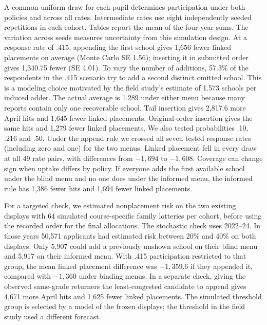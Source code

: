 A common uniform draw for each pupil determines participation under both policies and across all rates. Intermediate rates use eight independently seeded repetitions in each cohort. Tables report the mean of the four-year sums. The variation across seeds measures uncertainty from this simulation design. At a response rate of .415, appending the first school gives 1,656 fewer linked placements on average (Monte Carlo SE 1.56); inserting it in submitted order gives 1,340.75 fewer (SE 4.01). To vary the number of additions, 57.3\% of the respondents in the .415 scenario try to add a second distinct omitted school. This is a modeling choice motivated by the field study's estimate of 1.573 schools per induced adder. The actual average is 1.289 under either menu because many reports contain only one recoverable school. Tail insertion gives 2,817.6 more April hits and 1,645 fewer linked placements. Original-order insertion gives the same hits and 1,279 fewer linked placements. We also tested probabilities .10, .216 and .50. Under the append rule we crossed all seven tested response rates (including zero and one) for the two menus. Linked placement fell in every draw at all 49 rate pairs, with differences from $-1{,}694$ to $-1{,}608$. Coverage can change sign when uptake differs by policy. If everyone adds the first available school under the blind menu and no one does under the informed menu, the informed rule has 1,386 fewer hits and 1,694 fewer linked placements.

For a targeted check, we estimated nonplacement risk on the two existing displays with 64 simulated course-specific family lotteries per cohort, before using the recorded order for the final allocations. The stochastic check uses 2022--24. In those years 50,571 applicants had estimated risk between 20\% and 40\% on both displays. Only 5,907 could add a previously unshown school on their blind menu and 5,917 on their informed menu. With .415 participation restricted to that group, the mean linked placement difference was $-1{,}359.6$ if they appended it, compared with $-1{,}360$ under binding menus. In a separate check, giving the observed same-grade returners the least-congested candidate to append gives 4,671 more April hits and 1,625 fewer linked placements. The simulated threshold group is selected by a model of the frozen displays; the threshold in the field study used a different forecast.

